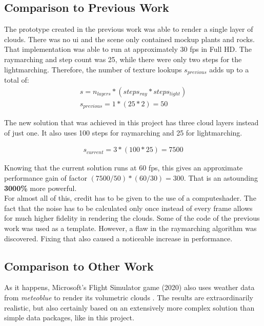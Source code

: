 \subsection{Comparison to Previous Work}
\label{section:techimpl:comparison}
The prototype created in the previous work was able to render a single layer of clouds. There was no \gls{ui} and the scene only contained mockup plants and rocks.
That implementation was able to run at approximately 30 \gls{fps} in Full HD. The \gls{raymarching} and step count was 25, while there were only two steps for the \gls{lightmarching}.
Therefore, the number of texture lookups $s_{previous}$ adds up to a total of:
$$
\begin{array}{l}
    s = n_{layers} * (steps_{ray} * steps_{light}) \\
    s_{previous} = 1 * (25 * 2) = 50
\end{array}
$$

\noindent
The new solution that was achieved in this project has three cloud layers instead of just one.
It also uses 100 steps for \gls{raymarching} and 25 for \gls{lightmarching}.

$$
\begin{array}{l}
    s_{current} = 3 * (100 * 25) = 7500
\end{array}
$$

\noindent
Knowing that the current solution runs at 60 \gls{fps}, this gives an approximate performance gain of factor $(7500 / 50) * (60/30) = 300$.
That is an astounding \textbf{3000\%} more powerful.
\\
For almost all of this, credit has to be given to the use of a \gls{computeshader}.
The fact that the \gls{noise} has to be calculated only once instead of every frame allows for much higher fidelity in rendering the clouds.
\emptyline
Some of the code of the previous work was used as a template.
However, a flaw in the \gls{raymarching} algorithm was discovered.
Fixing that also caused a noticeable increase in performance.

\clearpage

\subsection{Comparison to Other Work}
As it happens, Microsoft's Flight Simulator game (2020) also uses weather data from \emph{meteoblue} to render its \gls{volumetric} clouds \cite{meteoblue:msfs}.
The results are extraordinarily realistic, but also certainly based on an extensively more complex solution than simple data packages, like in this project.

